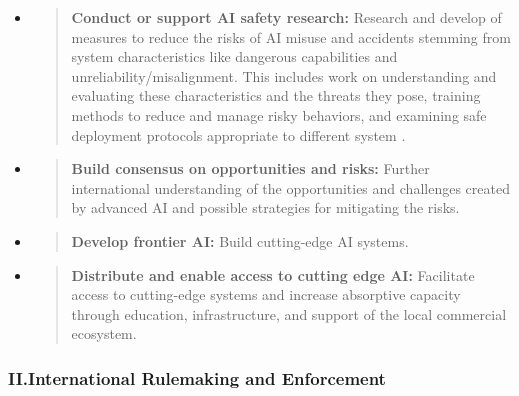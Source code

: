 \documentclass[12pt]{article}
\begin{document}
\begin{itemize}
\item
  \begin{quote}
  \textbf{Conduct or support AI safety research:} 
  Research and develop of measures to reduce the risks
  of AI misuse and accidents stemming from system characteristics like
  dangerous capabilities and unreliability/misalignment. This includes
  work on understanding and evaluating these characteristics and the
  threats they pose, training methods to reduce and manage risky
  behaviors, and examining safe deployment protocols appropriate to
  different system \cite{amodei_concrete_2016, hendrycks_unsolved_2022}.
  \end{quote}
\item
  \begin{quote}
  \textbf{Build consensus on opportunities and risks:} Further
  international understanding of the opportunities and challenges
  created by advanced AI and possible strategies for mitigating the
  risks.
  \end{quote}
\item
  \begin{quote}
  \textbf{Develop frontier AI:} Build cutting-edge AI systems.
  \end{quote}
\item
  \begin{quote}
  \textbf{Distribute and enable access to cutting edge AI:} Facilitate
  access to cutting-edge systems and increase absorptive capacity
  through education, infrastructure, and support of the local commercial
  ecosystem.
  \end{quote}
\end{itemize}

\subsubsection*{II.\quad International Rulemaking and Enforcement}
\end{document}
